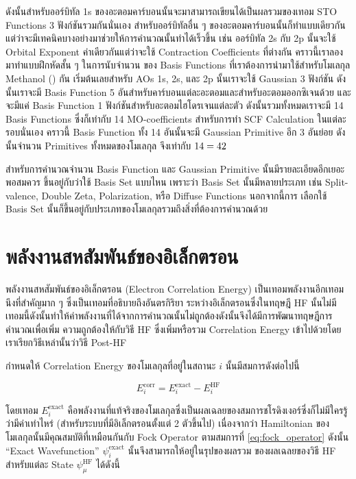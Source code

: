 \noindent ดังนั้นสำหรับออร์บิทัล 1s ของอะตอมคาร์บอนนั้นจะมาสามารถเขียนได้เป็นผลรวมของเทอม STO Functions 3 ฟังก์ชันรวมกันนั่นเอง 
สำหรับออร์บิทัลอื่น ๆ ของอะตอมคาร์บอนนั้นก็ทำแบบเดียวกันแต่ว่าจะมีเทคนิคบางอย่างมาช่วยให้การคำนวณนั้นทำได้เร็วขึ้น เช่น ออร์บิทัล 2s กับ 2p 
นั้นจะใช้ Orbital Exponent ค่าเดียวกันแต่ว่าจะใช้ Contraction Coefficients ที่ต่างกัน คราวนี้เราลองมาทำแบบฝึกหัดสั้น ๆ ในการนับจำนวน%
ของ Basis Functions ที่เราต้องการนำมาใช้สำหรับโมเลกุล Methanol () กัน เริ่มต้นเลยสำหรับ AOs 1s, 2s, และ 2p นั้นเราจะใช้ 
Gaussian 3 ฟังก์ชัน ดังนั้นเราจะมี Basis Function 5 อันสำหรับคาร์บอนแต่ละอะตอมและสำหรับอะตอมออกซิเจนด้วย และจะมีแค่ Basis Function 
1 ฟังก์ชันสำหรับอะตอมไฮโดรเจนแต่ละตัว ดังนั้นรวมทั้งหมดเราจะมี 14 Basis Functions ซึ่งก็เท่ากับ 14 MO-coefficients สำหรับการทำ SCF 
Calculation ในแต่ละรอบนั่นเอง คราวนี้ Basis Function ทั้ง 14 อันนั้นจะมี Gaussian Primitive อีก 3 อันย่อย ดังนั้นจำนวน Primitives 
ทั้งหมดของโมเลกุล  จึงเท่ากับ $14 \time 3 = 42$ 

สำหรับการคำนวณจำนวน Basis Function และ Gaussian Primitive นั้นมีรายละเอียดอีกเยอะพอสมควร ขึ้นอยู่กับว่าใช้ Basis Set แบบไหน 
เพราะว่า Basis Set นั้นมีหลายประเภท เช่น Split-valence, Double Zeta, Polarization, หรือ Diffuse Functions นอกจากนี้การ%
เลือกใช้ Basis Set นั้นก็ขึ้นอยู่กับประเภทของโมเลกุลรวมถึงสิ่งที่ต้องการคำนวณด้วย

\section{พลังงานสหสัมพันธ์ของอิเล็กตรอน}

พลังงานสหสัมพันธ์ของอิเล็กตรอน (Electron Correlation Energy) เป็นเทอมพลังงานอีกเทอมนึงที่สำคัญมาก ๆ ซึ่งเป็นเทอมที่อธิบายถึงอันตรกิริยา%
ระหว่างอิเล็กตรอนซึ่งในทฤษฎี HF นั้นไม่มีเทอมนี้ดังนั้นทำให้ค่าพลังงานที่ได้จากการคำนวณนั้นไม่ถูกต้องดังนั้นจึงได้มีการพัฒนาทฤษฎีการคำนวณเพื่อเพิ่ม%
ความถูกต้องให้กับวิธี HF ซึ่งเพิ่มหรือรวม Correlation Energy เข้าไปด้วยโดยเราเรียกวิธีเหล่านั้นว่าวิธี Post-HF

กำหนดให้ Correlation Energy ของโมเลกุลที่อยู่ในสถานะ $i$ นั้นมีสมการดังต่อไปนี้

\begin{equation}
    \label{eq:Correlation_Energy}
    E^{\text{corr}}_{i} = E^{\text{exact}}_{i} - E^{\text{HF}}_{i}
\end{equation}

\noindent โดยเทอม $E^{\text{exact}}_{i}$ คือพลังงานที่แท้จริงของโมเลกุลซึ่งเป็นผลเฉลยของสมการชโรดิงเงอร์ซึ่งก็ไม่มีใครรู้ว่ามีค่าเท่าไหร่ 
(สำหรับระบบที่มีอิเล็กตรอนตั้งแต่ 2 ตัวขึ้นไป) เนื่องจากว่า Hamiltonian ของโมเลกุลนั้นมีคุณสมบัติที่เหมือนกันกับ Fock Operator ตามสมการที่
\ref{eq:fock_operator} ดังนั้น \enquote{Exact Wavefunction} $\psi^{\text{exact}}_{i}$ นั้นจึงสามารถให้อยู่ในรุปของผลรวม%
ของผลเฉลยของวิธี HF สำหรับแต่ละ State $\psi^{\text{HF}}_{\mu}$ ได้ดังนี้


